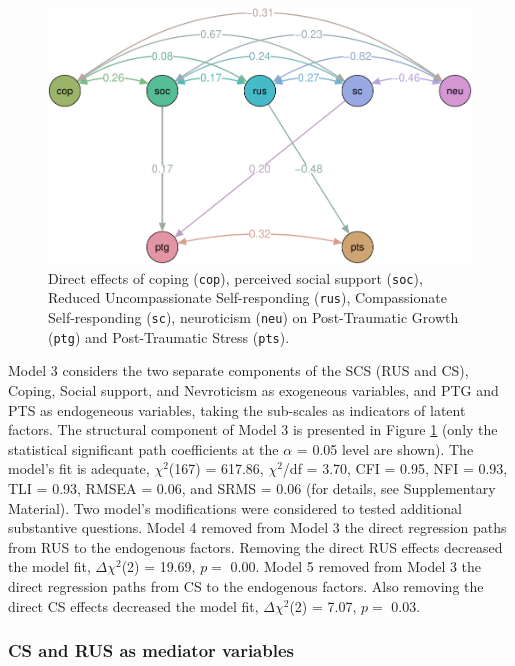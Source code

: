 \documentclass[
  english,
  man,floatsintext]{apa7}
\begin{document}
\begin{figure}
\centering
\includegraphics{validity_self_compassion_files/figure-latex/semplot-1.pdf}
\caption{\label{fig:semplot}Direct effects of coping (\texttt{cop}), perceived social support (\texttt{soc}), Reduced Uncompassionate Self-responding (\texttt{rus}), Compassionate Self-responding (\texttt{sc}), neuroticism (\texttt{neu}) on Post-Traumatic Growth (\texttt{ptg}) and Post-Traumatic Stress (\texttt{pts}).}
\end{figure}

Model 3 considers the two separate components of the SCS (RUS and CS), Coping, Social support, and Nevroticism as exogeneous variables, and PTG and PTS as endogeneous variables, taking the sub-scales as indicators of latent factors. The structural component of Model 3 is presented in Figure \ref{fig:semplot} (only the statistical significant path coefficients at the \(\alpha\) = 0.05 level are shown). The model's fit is adequate, \(\chi^2\)(167) = 617.86, \(\chi^2\)/df = 3.70, CFI = 0.95, NFI = 0.93, TLI = 0.93, RMSEA = 0.06, and SRMS = 0.06 (for details, see Supplementary Material). Two model's modifications were considered to tested additional substantive questions. Model 4 removed from Model 3 the direct regression paths from RUS to the endogenous factors. Removing the direct RUS effects decreased the model fit, \(\Delta \chi^2\)(2) = 19.69, \(p =\) 0.00. Model 5 removed from Model 3 the direct regression paths from CS to the endogenous factors. Also removing the direct CS effects decreased the model fit, \(\Delta \chi^2\)(2) = 7.07, \(p =\) 0.03.

\hypertarget{cs-and-rus-as-mediator-variables}{%
\subsubsection{CS and RUS as mediator variables}\label{cs-and-rus-as-mediator-variables}}
\end{document}
